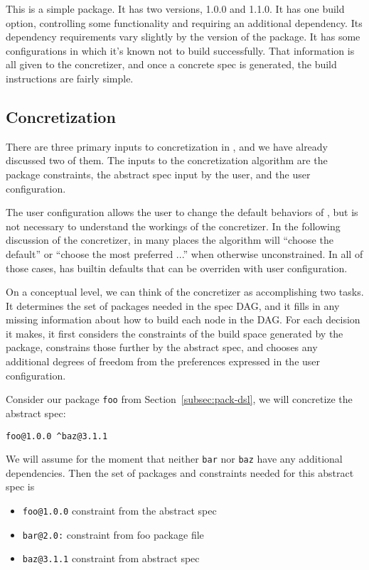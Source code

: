 This is a simple package. It has two versions, 1.0.0 and 1.1.0. It has one build option, controlling some functionality and requiring an additional dependency. Its dependency requirements vary slightly by the version of the package. It has some configurations in which it's known not to build successfully. That information is all given to the concretizer, and once a concrete spec is generated, the build instructions are fairly simple.

\subsection{Concretization}

There are three primary inputs to concretization in \spack{}, and we have already discussed two of them. The inputs to the concretization algorithm are the package constraints, the abstract spec input by the user, and the user configuration.

The user configuration allows the user to change the default behaviors of \spack{}, but is not necessary to understand the workings of the concretizer. In the following discussion of the concretizer, in many places the algorithm will ``choose the default'' or ``choose the most preferred ...'' when otherwise unconstrained. In all of those cases, \spack{} has builtin defaults that can be overriden with user configuration.

On a conceptual level, we can think of the concretizer as accomplishing two tasks. It determines the set of packages needed in the spec DAG, and it fills in any missing information about how to build each node in the DAG. For each decision it makes, it first considers the constraints of the build space generated by the package, constrains those further by the abstract spec, and chooses any additional degrees of freedom from the preferences expressed in the user configuration.

Consider our package \texttt{foo} from Section~\ref{subsec:pack-dsl}, we will concretize the abstract spec:
\begin{verbatim}
foo@1.0.0 ^baz@3.1.1
\end{verbatim}
We will assume for the moment that neither \texttt{bar} nor \texttt{baz} have any additional dependencies. Then the set of packages and constraints needed for this abstract spec is

\begin{itemize}
\item \texttt{foo@1.0.0} constraint from the abstract spec \\
\item \texttt{bar@2.0:} constraint from foo package file \\
\item \texttt{baz@3.1.1} constraint from abstract spec \\
\end{itemize}

